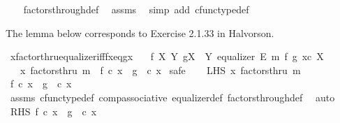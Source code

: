 \begin{isabellebody}
%
\isadelimproof
\ \ %
\endisadelimproof
%
\isatagproof
{}\isamarkupfalse%
\ factors{\isacharunderscore}{\kern0pt}through{\isacharunderscore}{\kern0pt}def\ \isamarkupfalse%
\ assms\ \isamarkupfalse%
\ {\isacharparenleft}{\kern0pt}simp\ add{\isacharcolon}{\kern0pt}\ cfunc{\isacharunderscore}{\kern0pt}type{\isacharunderscore}{\kern0pt}def{\isacharparenright}{\kern0pt}%
\endisatagproof
{\isafoldproof}%
%
\isadelimproof
%
\endisadelimproof
%
\begin{isamarkuptext}%
The lemma below corresponds to Exercise 2.1.33 in Halvorson.%
\end{isamarkuptext}\isamarkuptrue%
\isamarkupfalse%
\ xfactorthru{\isacharunderscore}{\kern0pt}equalizer{\isacharunderscore}{\kern0pt}iff{\isacharunderscore}{\kern0pt}fx{\isacharunderscore}{\kern0pt}eq{\isacharunderscore}{\kern0pt}gx{\isacharcolon}{\kern0pt}\isanewline
\ \ \ {\isachardoublequoteopen}f{\isacharcolon}{\kern0pt}\ X{\isasymrightarrow}\ Y{\isachardoublequoteclose}\ {\isachardoublequoteopen}g{\isacharcolon}{\kern0pt}X\ {\isasymrightarrow}\ Y{\isachardoublequoteclose}\ {\isachardoublequoteopen}equalizer\ E\ m\ f\ g{\isachardoublequoteclose}\ {\isachardoublequoteopen}x{\isasymin}\isactrlsub c\ X{\isachardoublequoteclose}\isanewline
\ \ \ {\isachardoublequoteopen}x\ factorsthru\ m\ {\isasymlongleftrightarrow}\ f\ {\isasymcirc}\isactrlsub c\ x\ {\isacharequal}{\kern0pt}\ g\ \ {\isasymcirc}\isactrlsub c\ x{\isachardoublequoteclose}\isanewline
%
\isadelimproof
%
\endisadelimproof
%
\isatagproof
{}\isamarkupfalse%
\ safe\isanewline
\ \ \isamarkupfalse%
\ LHS{\isacharcolon}{\kern0pt}\ {\isachardoublequoteopen}x\ factorsthru\ m{\isachardoublequoteclose}\isanewline
\ \ \isamarkupfalse%
\ \isamarkupfalse%
\ {\isachardoublequoteopen}f\ {\isasymcirc}\isactrlsub c\ x\ {\isacharequal}{\kern0pt}\ g\ \ {\isasymcirc}\isactrlsub c\ x{\isachardoublequoteclose}\isanewline
\ \ \ \ \isamarkupfalse%
\ assms{\isacharparenleft}{\kern0pt}{}{\isacharparenright}{\kern0pt}\ cfunc{\isacharunderscore}{\kern0pt}type{\isacharunderscore}{\kern0pt}def\ comp{\isacharunderscore}{\kern0pt}associative\ equalizer{\isacharunderscore}{\kern0pt}def\ factors{\isacharunderscore}{\kern0pt}through{\isacharunderscore}{\kern0pt}def\ \isamarkupfalse%
\ auto\isanewline
{}\isamarkupfalse%
\isanewline
\ \ \isamarkupfalse%
\ RHS{\isacharcolon}{\kern0pt}\ {\isachardoublequoteopen}f\ {\isasymcirc}\isactrlsub c\ x\ {\isacharequal}{\kern0pt}\ g\ \ {\isasymcirc}\isactrlsub c\ x{\isachardoublequoteclose}\isanewline

\end{isabellebody}
